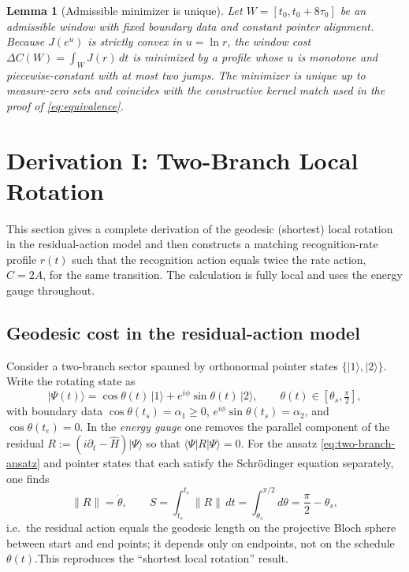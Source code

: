 \documentclass[11pt,letterpaper]{article}
\newtheorem{lemma}[theorem]{Lemma}
\theoremstyle{definition}
\begin{document}
\begin{lemma}[Admissible minimizer is unique]
Let $W=[t_0,t_0+8\tau_0]$ be an admissible window with fixed boundary data and constant pointer alignment. Because $J(e^u)$ is strictly convex in $u=\ln r$, the window cost $\Delta C(W)=\int_W J(r)\,dt$ is minimized by a profile whose $u$ is monotone and piecewise-constant with at most two jumps. The minimizer is unique up to measure-zero sets and coincides with the constructive kernel match used in the proof of \eqref{eq:equivalence}.
\end{lemma}

\section{Derivation I: Two-Branch Local Rotation}

This section gives a complete derivation of the geodesic (shortest) local rotation in the residual-action model and then constructs a matching recognition-rate profile \(r(t)\) such that the recognition action equals twice the rate action, \(C=2A\), for the same transition. The calculation is fully local and uses the energy gauge throughout.

\subsection{Geodesic cost in the residual-action model}

Consider a two-branch sector spanned by orthonormal pointer states \(\{|1\rangle,|2\rangle\}\). Write the rotating state as
\begin{equation}
\label{eq:two-branch-ansatz}
|\Psi(t)\rangle=\cos\theta(t)\,|1\rangle+e^{i\phi}\sin\theta(t)\,|2\rangle,
\qquad \theta(t)\in[\theta_s,\tfrac{\pi}{2}],
\end{equation}
with boundary data \(\cos\theta(t_s)=\alpha_1\ge 0\), \(e^{i\phi}\sin\theta(t_s)=\alpha_2\), and \(\cos\theta(t_e)=0\). In the \emph{energy gauge} one removes the parallel component of the residual \(R:=(i\partial_t-\hat H)|\Psi\rangle\) so that \(\langle\Psi|R|\Psi\rangle=0\). For the ansatz \eqref{eq:two-branch-ansatz} and pointer states that each satisfy the Schr\"odinger equation separately, one finds
\begin{equation}
\|R\|=\dot\theta,
\qquad
S=\int_{t_s}^{t_e}\!\|R\|\,dt=\int_{\theta_s}^{\pi/2} d\theta=\frac{\pi}{2}-\theta_s,
\label{eq:S-geodesic}
\end{equation}
i.e.\ the residual action equals the geodesic length on the projective Bloch sphere between start and end points; it depends only on endpoints, not on the schedule \(\theta(t)\).\;This reproduces the ``shortest local rotation'' result.
\end{document}
